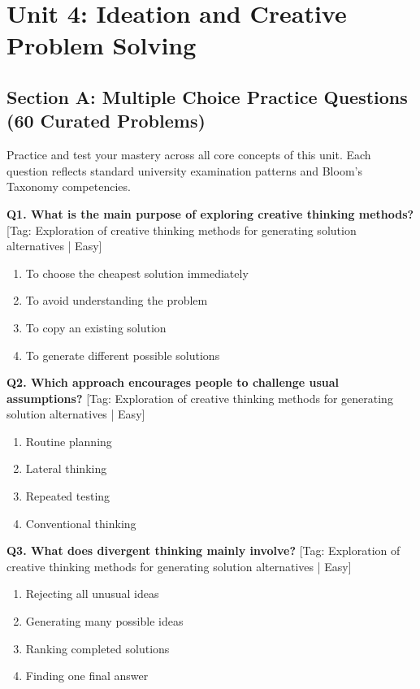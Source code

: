 \chapter{Unit 4: Ideation and Creative Problem Solving}


\section{Section A: Multiple Choice Practice Questions (60 Curated Problems)}

\noindent Practice and test your mastery across all core concepts of this unit. Each question reflects standard university examination patterns and Bloom's Taxonomy competencies.
\vspace{3mm}

\noindent\textbf{Q1. What is the main purpose of exploring creative thinking methods?} \hfill [Tag: Exploration of creative thinking methods for generating solution alternatives | Easy]
\begin{enumerate}[label=(\alph*),topsep=2pt,itemsep=1pt,partopsep=0pt,parsep=0pt]
    \item {To choose the cheapest solution immediately}
    \item {To avoid understanding the problem}
    \item {To copy an existing solution}
    \item {To generate different possible solutions}
\end{enumerate}
\vspace{2mm}

\noindent\textbf{Q2. Which approach encourages people to challenge usual assumptions?} \hfill [Tag: Exploration of creative thinking methods for generating solution alternatives | Easy]
\begin{enumerate}[label=(\alph*),topsep=2pt,itemsep=1pt,partopsep=0pt,parsep=0pt]
    \item {Routine planning}
    \item {Lateral thinking}
    \item {Repeated testing}
    \item {Conventional thinking}
\end{enumerate}
\vspace{2mm}

\noindent\textbf{Q3. What does divergent thinking mainly involve?} \hfill [Tag: Exploration of creative thinking methods for generating solution alternatives | Easy]
\begin{enumerate}[label=(\alph*),topsep=2pt,itemsep=1pt,partopsep=0pt,parsep=0pt]
    \item {Rejecting all unusual ideas}
    \item {Generating many possible ideas}
    \item {Ranking completed solutions}
    \item {Finding one final answer}
\end{enumerate}
\vspace{2mm}

